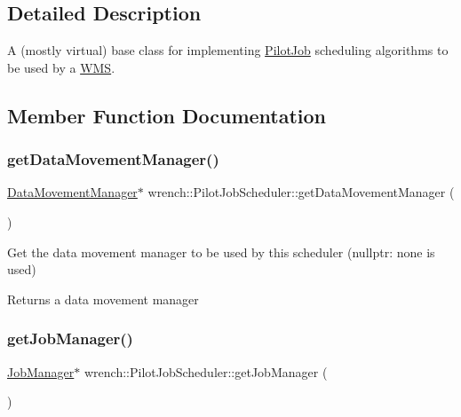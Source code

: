 \subsection{Detailed Description}
A (mostly virtual) base class for implementing \hyperlink{classwrench_1_1_pilot_job}{Pilot\+Job} scheduling algorithms to be used by a \hyperlink{classwrench_1_1_w_m_s}{W\+MS}. 

\subsection{Member Function Documentation}
\mbox{\label{classwrench_1_1_pilot_job_scheduler_ab161a17fd3c1a7f5af171f813e32f3a1}} 
\subsubsection{\texorpdfstring{get\+Data\+Movement\+Manager()}{getDataMovementManager()}}
{\footnotesize\ttfamily \hyperlink{classwrench_1_1_data_movement_manager}{Data\+Movement\+Manager}$\ast$ wrench\+::\+Pilot\+Job\+Scheduler\+::get\+Data\+Movement\+Manager (\begin{DoxyParamCaption}{ }\end{DoxyParamCaption})\hspace{0.3cm}{\ttfamily [inline]}}



Get the data movement manager to be used by this scheduler (nullptr\+: none is used) 

\begin{DoxyReturn}{Returns}
a data movement manager 
\end{DoxyReturn}
\mbox{\label{classwrench_1_1_pilot_job_scheduler_acd33b44c3481d911489626dc3f0ea957}} 
\subsubsection{\texorpdfstring{get\+Job\+Manager()}{getJobManager()}}
{\footnotesize\ttfamily \hyperlink{classwrench_1_1_job_manager}{Job\+Manager}$\ast$ wrench\+::\+Pilot\+Job\+Scheduler\+::get\+Job\+Manager (\begin{DoxyParamCaption}{ }\end{DoxyParamCaption})\hspace{0.3cm}{\ttfamily [inline]}}



